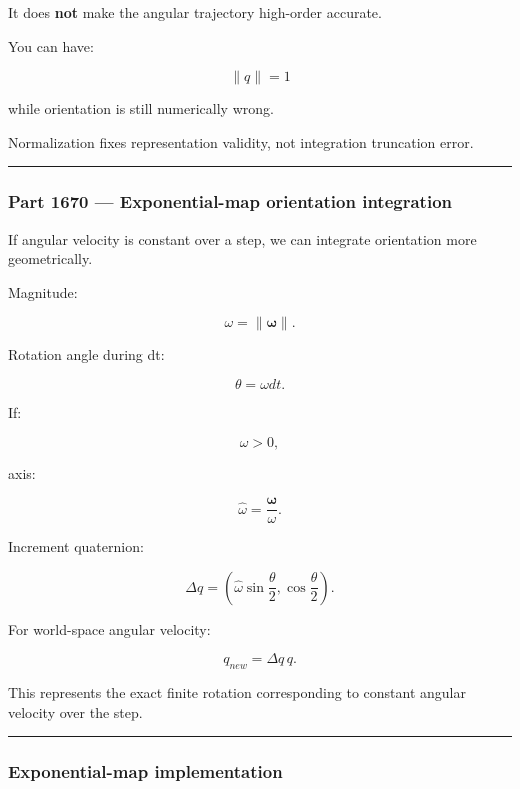 It does \textbf{not} make the angular trajectory high-order accurate.

You can have:

\[
\|q\|=1
\]

while orientation is still numerically wrong.

Normalization fixes representation validity, not integration truncation error.

\begin{center}\rule{0.5\linewidth}{0.5pt}\end{center}

\subsubsection{Part 1670 --- Exponential-map orientation integration}\label{part-1670-exponential-map-orientation-integration}

If angular velocity is constant over a step, we can integrate orientation more geometrically.

Magnitude:

\[
\omega=
\|\boldsymbol\omega\|.
\]

Rotation angle during dt:

\[
\theta
=
\omega dt.
\]

If:

\[
\omega>0,
\]

axis:

\[
\hat\omega
=
\frac{\boldsymbol\omega}{\omega}.
\]

Increment quaternion:

\[
\boxed{
\Delta q
=
\left(
\hat\omega
\sin\frac{\theta}{2},
\cos\frac{\theta}{2}
\right).
}
\]

For world-space angular velocity:

\[
\boxed{
q_{new}
=
\Delta q\,q.
}
\]

This represents the exact finite rotation corresponding to constant angular velocity over the step.

\begin{center}\rule{0.5\linewidth}{0.5pt}\end{center}

\subsubsection{Exponential-map implementation}\label{exponential-map-implementation}

